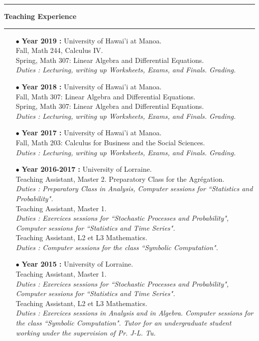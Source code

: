 \documentclass[a4paper,11pt]{article}
\newcommand{\titre}[1]{%
	\begin{center}
	\bigskip
	\rule{\textwidth}{1pt}
	\par\vspace{0.1cm}
        \textbf{\large #1}
	\par\rule{\textwidth}{1pt}
	\end{center}
	\bigskip
	}
\begin{document}
\newpage
\titre{Teaching Experience}
\begin{itemize}

\item[$\bullet$] \textbf{ Year 2019 :} University of Hawai'i at Manoa.\\
					Fall, Math 244, Calculus IV.\\
					Spring, Math 307: Linear Algebra and Differential Equations.\\
					\textit{Duties : Lecturing, writing up Worksheets, Exams, and Finals. Grading.}\\

\item[$\bullet$] \textbf{ Year 2018 :} University of Hawai'i at Manoa.\\
					Fall, Math 307: Linear Algebra and Differential Equations.\\
					Spring, Math 307: Linear Algebra and Differential Equations.\\
					\textit{Duties : Lecturing, writing up Worksheets, Exams, and Finals. Grading.}\\

\item[$\bullet$] \textbf{ Year 2017 :} University of Hawai'i at Manoa.\\
					Fall, Math 203: Calculus for Business and the Social Sciences.\\
					\textit{Duties : Lecturing, writing up Worksheets, Exams, and Finals. Grading.}\\

\item[$\bullet$] \textbf{ Year 2016-2017 :} University of Lorraine.\\
					Teaching Assistant, Master 2. Preparatory Class for the Agrégation.\\
					\textit{Duties : Preparatory Class in Analysis, Computer sessions for ``Statistics and Probability".}\\
					Teaching Assistant, Master 1.\\
					\textit{Duties : Exercices sessions for ``Stochastic Processes and Probability", Computer sessions for ``Statistics and Time Series".}\\
					Teaching Assistant, L2 et L3 Mathematics. \\
					\textit{Duties : Computer sessions for the class ``Symbolic Computation".}\\   
\item[$\bullet$] \textbf{ Year 2015 :} University of Lorraine.\\
					Teaching Assistant, Master 1.\\
					\textit{Duties : Exercices sessions for ``Stochastic Processes and Probability", Computer sessions for ``Statistics and Time Series".}\\
					Teaching Assistant, L2 et L3 Mathematics. \\
					\textit{Duties : Exercices sessions in Analysis and in Algebra. Computer sessions for the class ``Symbolic Computation". Tutor for an undergraduate student working under the supervision of Pr. J-L. Tu.}\\   
					

\end{itemize}
\end{document}
